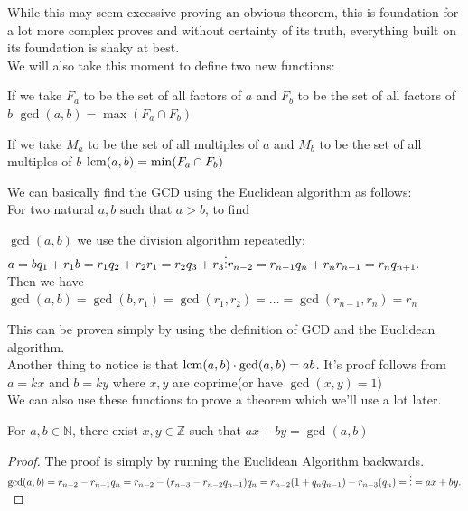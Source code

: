 While this may seem excessive proving an obvious theorem, this is foundation for a lot more complex proves and without certainty of its truth, everything built on its foundation is shaky at best.\\
We will also take this moment to define two new functions:\\
\begin{definition}
If we take $F_a$ to be the set of all factors of $a$ and $F_b$ to be the set of all factors of $b$
    $\gcd(a,b)= \max( F_a \cap F_b)$
\end{definition}
\begin{definition}
If we take $M_a$ to be the set of all multiples of $a$ and $M_b$ to be the set of all multiples of $b$
    $\operatorname*{lcm}(a,b)= \min( F_a \cap F_b)$
\end{definition}
We can basically find the GCD using the Euclidean algorithm as follows:\\
For two natural $a, b$ such that $a > b$, to find
\begin{theorem}
$\gcd(a, b)$ we use the division algorithm repeatedly:\\
$a = bq_1 + r_1\\
b = r_1q_2 + r_2\\
r_1 = r_2q_3 + r_3\\
\vdots\\
r_{n-2} = r_{n-1}q_n + r_n\\
r_{n-1} = r_nq_{n+1}.$\\
Then we have $\gcd(a, b) = \gcd(b, r_1) = \gcd(r_1, r_2) = \dots = \gcd(r_{n-1}, r_n) = r_n$\\
\end{theorem}
This can be proven simply by using the definition of GCD and the Euclidean algorithm.\\
Another thing to notice is that $\operatorname*{lcm}(a,b)\cdot \gcd(a,b)=ab$. It's proof follows from $a=kx$ and $b=ky$ where $x,y$ are coprime(or have $\gcd(x,y)=1$)\\
We can also use these functions to prove a theorem which we'll use a lot later.\\
\begin{theorem}
    For $a, b \in \mathbb{N}$, there exist $x, y \in \mathbb{Z}$ such that $ax + by = \gcd(a, b)$
\end{theorem}
\begin{proof}
    The proof is simply by running the Euclidean Algorithm backwards.
    $\gcd(a, b) = r_{n-2} - r_{n-1}q_n\\
    = r_{n-2} - (r_{n-3} - r_{n-2}q_{n-1})q_n\\
    = r_{n-2}(1 + q_nq_{n-1}) - r_{n-3} (q_n)\\
    = \vdots\\
    = ax + by.$\\
\end{proof}
